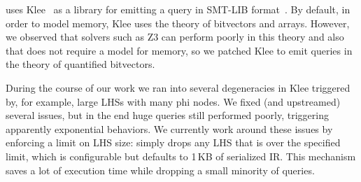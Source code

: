 \tool{} uses Klee~\cite{Cadar08} as a library for emitting a query in SMT-LIB
format~\cite{Barrett10}.
%
By default, in order to model memory, Klee uses the theory of
bitvectors and arrays.
%
However, we observed that solvers such as Z3 can perform poorly in
this theory and also that \tool{} does not require a model for memory,
so we patched Klee to emit queries in the theory of quantified
bitvectors.


During the course of our work we ran into several degeneracies in Klee
triggered by, for example, large \tool{} LHSs with many phi nodes.
%
We fixed (and upstreamed) several issues, but in the end huge \tool{}
queries still performed poorly, triggering apparently exponential
behaviors.
%
We currently work around these issues by enforcing a limit on LHS
size: \tool{} simply drops any LHS that is over the specified limit,
which is configurable but defaults to 1\,KB of serialized IR\@.
%
This mechanism saves a lot of execution time while dropping a small
minority of queries.

